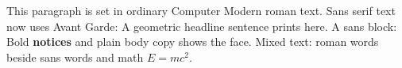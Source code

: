 \documentclass{article}
\begin{document}
This paragraph is set in ordinary Computer Modern roman text.
Sans serif text now uses Avant Garde: \textsf{A geometric headline sentence} prints here.
A sans block: {\sffamily Bold \textbf{notices} and plain body copy} shows the face.
Mixed text: roman words beside \textsf{sans words} and math $E = mc^2$.
\end{document}
